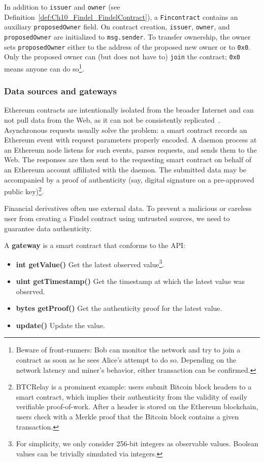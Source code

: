 In addition to \texttt{issuer} and \texttt{owner} (see Definition~\ref{def:Ch10_Findel_FindelContract}), a \texttt{Fincontract} contains an auxiliary \texttt{proposedOwner} field.
On contract creation, \texttt{issuer}, \texttt{owner}, and \texttt{proposedOwner} are initialized to \texttt{msg.sender}.
To transfer ownership, the owner sets \texttt{proposedOwner} either to the address of the proposed new owner or to \texttt{0x0}.
Only the proposed owner can (but does not have to) \texttt{join} the contract; \texttt{0x0} means anyone can do so\footnote{Beware of front-runners: Bob can monitor the network and try to join a contract as soon as he sees Alice's attempt to do so. Depending on the network latency and miner's behavior, either transaction can be confirmed.}.


\subsubsection{Data sources and gateways} \label{def:Ch10_Findel_Gateways}

Ethereum contracts are intentionally isolated from the broader Internet and can not pull data from the Web, as it can not be consistently replicated~\cite{Greenspan2016}.
Asynchronous requests usually solve the problem: a smart contract records an Ethereum event with request parameters properly encoded.
A daemon process at an Ethereum node listens for such events, parses requests, and sends them to the Web.
The responses are then sent to the requesting smart contract on behalf of an Ethereum account affiliated with the daemon.
The submitted data may be accompanied by a proof of authenticity (say, digital signature on a pre-approved public key)\footnote{BTCRelay is a prominent example: users submit Bitcoin block headers to a smart contract, which implies their authenticity from the validity of easily verifiable proof-of-work. After a header is stored on the Ethereum blockchain, users check with a Merkle proof that the Bitcoin block contains a given transaction.}.

Financial derivatives often use external data.
To prevent a malicious or careless user from creating a Findel contract using untrusted sources, we need to guarantee data authenticity.

\begin{definition}
	A \textbf{gateway} is a smart contract that conforms to the API:
	
	\begin{itemize}
		\item \textbf{int getValue()} Get the latest observed value\footnote{For simplicity, we only consider 256-bit integers as observable values. Boolean values can be trivially simulated via integers.}.
		\item \textbf{uint getTimestamp()} Get the timestamp at which the latest value was observed.
		\item \textbf{bytes getProof()} Get the authenticity proof for the latest value.
		\item \textbf{update()} Update the value.
	\end{itemize}
	
\end{definition}

